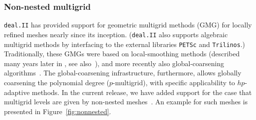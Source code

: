 \documentclass{ansarticle-preprint}
\newcommand{\specialword}[1]{\texttt{#1}}
\newcommand{\dealii}{{\specialword{deal.II}}\xspace}
\begin{document}
\subsubsection{Non-nested multigrid}

\dealii has provided support for geometric multigrid methods (GMG)
for locally refined meshes nearly since its inception. (\dealii{} also
supports algebraic multigrid methods by interfacing to the external
libraries \texttt{PETSc} and \texttt{Trilinos}.)
Traditionally, these GMGs were based on local-smoothing
methods (described many years later in \cite{Kanschat2004,JanssenKanschat2011}, see
also~\cite{ClevengerHeisterKanschatKronbichler2019}), and more
recently also global-coarsening algorithms~\cite{munch2022gc}. The global-coarsening
infrastructure, furthermore, allows globally coarsening the polynomial degree ($p$-multigrid),
with specific applicability to $hp$-adaptive methods.
In the current release, we have added support for the case
that multigrid levels are given by non-nested meshes~\cite{adams2002evaluation, bittencourt2001nonnested, bramble1991analysis}. An example for such meshes is
presented in Figure~\ref{fig:nonnested}.
\end{document}
